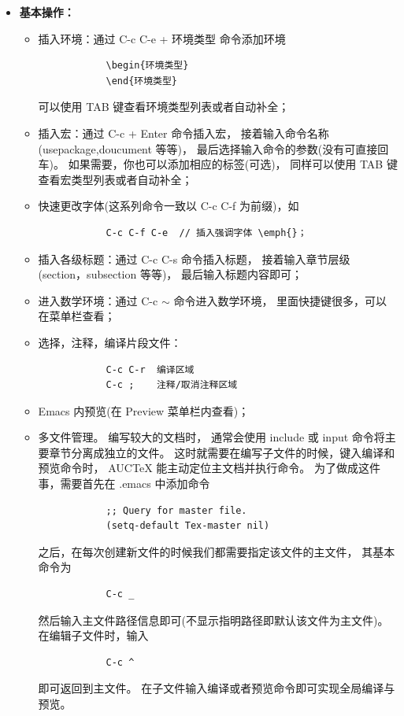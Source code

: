 \begin{itemize}
	\item \textbf{基本操作：}
	\begin{itemize}
		\item 插入环境：通过 C-c C-e + 环境类型 命令添加环境
			\begin{verbatim}
			\begin{环境类型}
			\end{环境类型}
			\end{verbatim}
			可以使用 TAB 键查看环境类型列表或者自动补全；
		\item 插入宏：通过 C-c + Enter 命令插入宏，
			接着输入命令名称(usepackage,doucument 等等)，
			最后选择输入命令的参数(没有可直接回车)。
			如果需要，你也可以添加相应的标签(可选)，
			同样可以使用 TAB 键查看宏类型列表或者自动补全； 
		\item 快速更改字体(这系列命令一致以 C-c C-f 为前缀)，如
			\begin{verbatim}
			C-c C-f C-e  // 插入强调字体 \emph{}；
			\end{verbatim}
		\item 插入各级标题：通过 C-c C-s 命令插入标题，
			接着输入章节层级(section，subsection 等等)，
	    	最后输入标题内容即可；
		\item 进入数学环境：通过 C-c $\sim$ 命令进入数学环境，
			里面快捷键很多，可以在菜单栏查看；
		\item 选择，注释，编译片段文件：
			\begin{verbatim}
			C-c C-r  编译区域
			C-c ;    注释/取消注释区域
			\end{verbatim}
		\item Emacs 内预览(在 Preview 菜单栏内查看)；
		\item 多文件管理。
			编写较大的文档时，
			通常会使用 include 或 input 命令将主要章节分离成独立的文件。
			这时就需要在编写子文件的时候，键入编译和预览命令时，
			AUCTeX 能主动定位主文档并执行命令。
			为了做成这件事，需要首先在 .emacs 中添加命令
			\begin{verbatim}
			;; Query for master file.
			(setq-default Tex-master nil)
			\end{verbatim}
			之后，在每次创建新文件的时候我们都需要指定该文件的主文件，
			其基本命令为
			\begin{verbatim}
			C-c _ 
			\end{verbatim}
			然后输入主文件路径信息即可(不显示指明路径即默认该文件为主文件)。
			在编辑子文件时，输入
			\begin{verbatim}
			C-c ^
			\end{verbatim}
			即可返回到主文件。
			在子文件输入编译或者预览命令即可实现全局编译与预览。
	\end{itemize}
\end{itemize}


